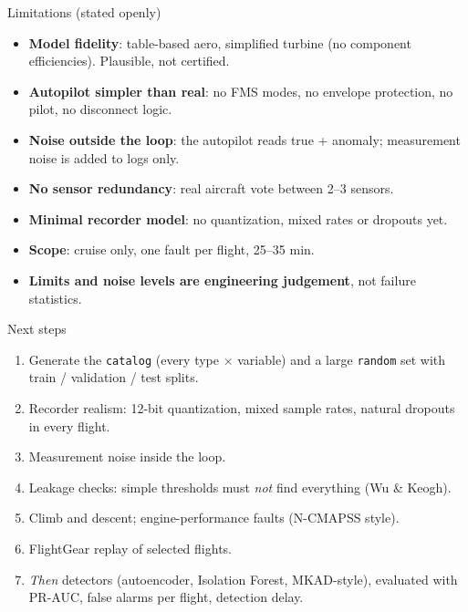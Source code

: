 \documentclass[aspectratio=169,11pt]{beamer}
\begin{document}
\begin{frame}{Limitations (stated openly)}
  \small
  \begin{itemize}\setlength\itemsep{0.45em}
    \item \textbf{Model fidelity}: table-based aero, simplified turbine (no component efficiencies). Plausible, not certified.
    \item \textbf{Autopilot simpler than real}: no FMS modes, no envelope protection, no pilot, no disconnect logic.
    \item \textbf{Noise outside the loop}: the autopilot reads true + anomaly; measurement noise is added to logs only.
    \item \textbf{No sensor redundancy}: real aircraft vote between 2--3 sensors.
    \item \textbf{Minimal recorder model}: no quantization, mixed rates or dropouts yet.
    \item \textbf{Scope}: cruise only, one fault per flight, 25--35 min.
    \item \textbf{Limits and noise levels are engineering judgement}, not failure statistics.
  \end{itemize}
\end{frame}

\begin{frame}{Next steps}
  \begin{enumerate}\setlength\itemsep{0.5em}
    \item Generate the \texttt{catalog} (every type $\times$ variable) and a large \texttt{random} set with train / validation / test splits.
    \item Recorder realism: 12-bit quantization, mixed sample rates, natural dropouts in every flight.
    \item Measurement noise inside the loop.
    \item Leakage checks: simple thresholds must \emph{not} find everything (Wu \& Keogh).
    \item Climb and descent; engine-performance faults (N-CMAPSS style).
    \item FlightGear replay of selected flights.
    \item \emph{Then} detectors (autoencoder, Isolation Forest, MKAD-style), evaluated with PR-AUC, false alarms per flight, detection delay.
  \end{enumerate}
\end{frame}
\end{document}
